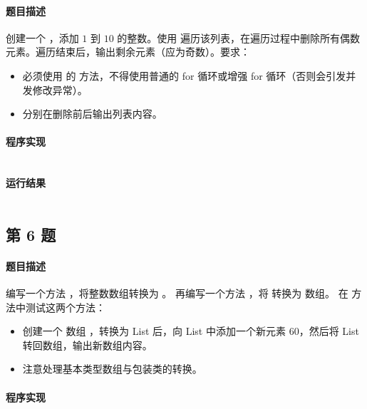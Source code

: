\documentclass{academics}
\begin{document}
\paragraph{题目描述} {
    创建一个 ，添加 $1$ 到 $10$ 的整数。使用  遍历该列表，在遍历过程中删除所有偶数元素。遍历结束后，输出剩余元素（应为奇数）。要求：
    \begin{itemize}
        \item 必须使用  的  方法，不得使用普通的 for 循环或增强 for 循环（否则会引发并发修改异常）。
        \item 分别在删除前后输出列表内容。
    \end{itemize}
}

\paragraph{程序实现} {
    \inputminted[label=IteratorRemove.java]{java}{../src/P05/IteratorRemove.java}
}

\paragraph{运行结果} {
    \inputminted{text}{../res/P05.out}
}

\subsection{第 6 题}

\paragraph{题目描述} {
    编写一个方法 ，将整数数组转换为 。
    再编写一个方法 ，将  转换为  数组。
    在  方法中测试这两个方法：
    \begin{itemize}
        \item 创建一个  数组 ，转换为 List 后，向 List 中添加一个新元素 $60$，然后将 List 转回数组，输出新数组内容。
        \item 注意处理基本类型数组与包装类的转换。
    \end{itemize}
}

\paragraph{程序实现} {
    \inputminted[label=ArrayToList.java]{java}{../src/P06/ArrayToList.java}
}
\end{document}

